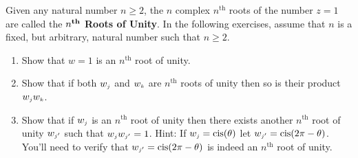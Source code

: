 { Given any natural number $n \geq 2$, the $n$ complex $n^{\text{th}}$ roots of the number $z = 1$ are called the \textbf{\boldmath $n^{\mbox{\textbf{\scriptsize th}}}$ Roots of Unity}.    In the following exercises, assume that $n$ is a fixed, but arbitrary, natural number such that $n \geq 2$. 
\begin{enumerate} 
\item  Show that $w = 1$ is an $n^{\text{th}}$ root of unity. 
\item  Show that if both $w_{\text{\tiny$j$}}$ and $w_{\text{\tiny$k$}}$ are $n^{\text{th}}$ roots of unity then so is their product $w_{\text{\tiny$j$}}w_{\text{\tiny$k$}}$. 
\item  Show that if $w_{\text{\tiny$j$}}$ is an $n^{\text{th}}$ root of unity then there exists another $n^{\text{th}}$ root of unity $w_{\text{\tiny$j'$}}$ such that $w_{\text{\tiny$j$}}w_{\text{\tiny$j'$}} = 1$.  Hint: If $w_{\text{\tiny$j$}} = \operatorname{cis}(\theta)$ let $w_{\text{\tiny$j'$}} = \operatorname{cis}(2\pi - \theta)$. You'll need to verify that $w_{\text{\tiny$j'$}} = \operatorname{cis}(2\pi - \theta)$ is indeed an $n^{\text{th}}$ root of unity. 
\end{enumerate}}
{}

